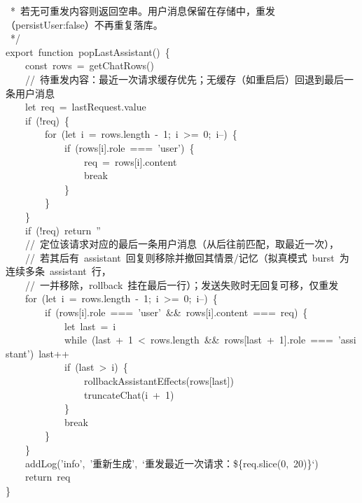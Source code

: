 \documentclass[a4paper,10pt]{article}
\begin{document}
{\ttfamily\footnotesize\raggedright
~*~若无可重发内容则返回空串。用户消息保留在存储中，重发（persistUser:false）不再重复落库。\\
~*/\\
export~function~popLastAssistant()~\{\\
~~~~const~rows~=~getChatRows()\\
~~~~//~待重发内容：最近一次请求缓存优先；无缓存（如重启后）回退到最后一条用户消息\\
~~~~let~req~=~lastRequest.value\\
~~~~if~(!req)~\{\\
~~~~~~~~for~(let~i~=~rows.length~-~1;~i~>=~0;~i--)~\{\\
~~~~~~~~~~~~if~(rows[i].role~===~'user')~\{\\
~~~~~~~~~~~~~~~~req~=~rows[i].content\\
~~~~~~~~~~~~~~~~break\\
~~~~~~~~~~~~\}\\
~~~~~~~~\}\\
~~~~\}\\
~~~~if~(!req)~return~''\\
~~~~//~定位该请求对应的最后一条用户消息（从后往前匹配，取最近一次），\\
~~~~//~若其后有~assistant~回复则移除并撤回其情景/记忆（拟真模式~burst~为连续多条~assistant~行，\\
~~~~//~一并移除，rollback~挂在最后一行）；发送失败时无回复可移，仅重发\\
~~~~for~(let~i~=~rows.length~-~1;~i~>=~0;~i--)~\{\\
~~~~~~~~if~(rows[i].role~===~'user'~\&\&~rows[i].content~===~req)~\{\\
~~~~~~~~~~~~let~last~=~i\\
~~~~~~~~~~~~while~(last~+~1~<~rows.length~\&\&~rows[last~+~1].role~===~'assistant')~last++\\
~~~~~~~~~~~~if~(last~>~i)~\{\\
~~~~~~~~~~~~~~~~rollbackAssistantEffects(rows[last])\\
~~~~~~~~~~~~~~~~truncateChat(i~+~1)\\
~~~~~~~~~~~~\}\\
~~~~~~~~~~~~break\\
~~~~~~~~\}\\
~~~~\}\\
~~~~addLog('info',~'重新生成',~`重发最近一次请求：\$\{req.slice(0,~20)\}`)\\
~~~~return~req\\
\}\\
}
\end{document}
